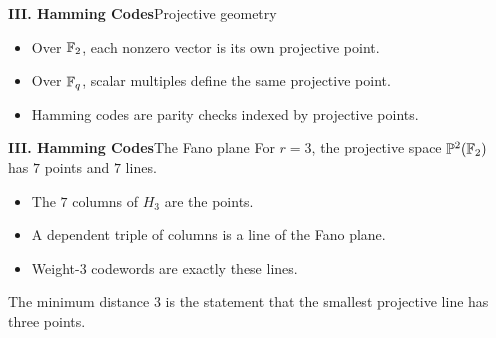 \begin{frame}{\textbf{III. Hamming Codes}}{Projective geometry}
\small
{}
\begin{itemize}
  \item Over $\mathbb{F}_2$, each nonzero vector is its own projective point.
  \item Over $\mathbb{F}_q$, scalar multiples define the same projective point.
  \item Hamming codes are parity checks indexed by projective points.
\end{itemize}
\end{frame}

\begin{frame}{\textbf{III. Hamming Codes}}{The Fano plane}
\small
For $r=3$, the projective space $\mathbb{P}^2(\mathbb{F}_2)$ has $7$ points and $7$ lines.
\begin{itemize}
  \item The $7$ columns of $H_3$ are the points.
  \item A dependent triple of columns is a line of the Fano plane.
  \item Weight-$3$ codewords are exactly these lines.
\end{itemize}
The minimum distance $3$ is the statement that the smallest projective line has three points.
\end{frame}

